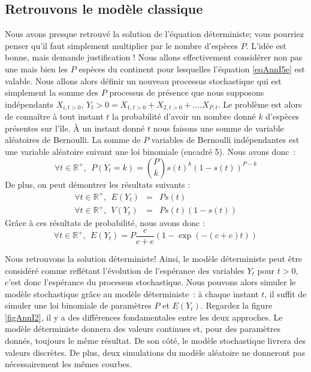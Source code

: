 \subsection{Retrouvons le modèle classique}
Nous avons presque retrouvé la solution de l'équation déterministe; vous pourriez penser qu'il faut simplement multiplier par le nombre d'espèces $P$. L'idée est bonne, mais demande justification ! Nous allons effectivement considérer non pas une mais bien les $P$ espèces du continent pour lesquelles l'équation \eqref{eqAnnI5e} est valable. Nous allons alors définir un nouveau processus stochastique qui est simplement la somme des $P$ processus de présence que nous supposons indépendants $X_{i,t>0}$, $Y_t>0=X_{1,t>0}+X_{2,t>0}+....X_{P,t}$. Le problème est alors de connaître à tout instant $t$ la probabilité d'avoir un nombre donné $k$ d'espèces présentes sur l'île. À un instant donné $t$ nous faisons une somme de variable aléatoires de Bernoulli. La somme de $P$ variables de Bernoulli indépendantes est une variable aléatoire suivant une loi binomiale (encadré 5). Nous avons donc~:
\begin{equation}
 \forall t \in \mathbb{R}^+, ~~\label{eqAnnI6a} P(Y_t=k)=\binom{P}{k}s(t)^k(1-s(t))^{P-k}
\end{equation}
De plus, on peut démontrer les résultats suivants :
\begin{eqnarray}
 \forall t \in \mathbb{R}^+, ~~\label{eqAnnI6b} E(Y_t)&=&Ps(t) \\
 \forall t \in \mathbb{R}^+, ~~\label{eqAnnI6c} V(Y_t)&=&Ps(t)(1-s(t))
\end{eqnarray}
Grâce à ces résultats de probabilité, nous avons donc :
\begin{equation}
 \forall t \in \mathbb{R}^+, ~~\label{eqAnnI6d} E(Y_t)=P\frac{c}{c+e}(1-\exp(-(c+e)t))
\end{equation}

Nous retrouvons la solution déterministe! Ainsi, le modèle déterministe peut être considéré comme reflétant l'évolution de l'espérance des variables $Y_t$ pour $t>0$, c'est donc l'espérance du processus stochastique. Nous pouvons alors simuler le modèle stochastique grâce au modèle déterministe~: à chaque instant $t$, il suffit de simuler une loi binomiale de paramètres $P$ et $E(Y_t)$. Regardez la figure \ref{figAnnI2}, il y a des différences fondamentales entre les deux approches. Le modèle déterministe donnera des valeurs continues et, pour des paramètres donnés, toujours le même résultat. De son côté, le modèle stochastique livrera des valeurs discrètes. De plus, deux simulations du modèle aléatoire ne donneront pas nécessairement les mêmes courbes.

